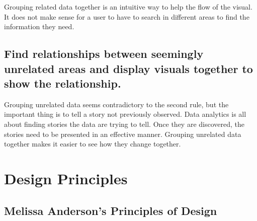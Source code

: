 \documentclass[]{book}
\theoremstyle{definition}
\theoremstyle{definition}
\theoremstyle{definition}
\theoremstyle{remark}
\begin{document}
Grouping related data together is an intuitive way to help the flow of
the visual. It does not make sense for a user to have to search in
different areas to find the information they need.

\subsection{Find relationships between seemingly unrelated areas and
display visuals together to show the
relationship.}\label{find-relationships-between-seemingly-unrelated-areas-and-display-visuals-together-to-show-the-relationship.}

Grouping unrelated data seems contradictory to the second rule, but the
important thing is to tell a story not previously observed. Data
analytics is all about finding stories the data are trying to tell. Once
they are discovered, the stories need to be presented in an effective
manner. Grouping unrelated data together makes it easier to see how they
change together.

\section{Design Principles}\label{design-principles}

\subsection{\texorpdfstring{Melissa Anderson's Principles of Design
\citep{design_principles}}{Melissa Anderson's Principles of Design {[}@design\_principles{]}}}\label{melissa-andersons-principles-of-design-design_principles}
\end{document}
